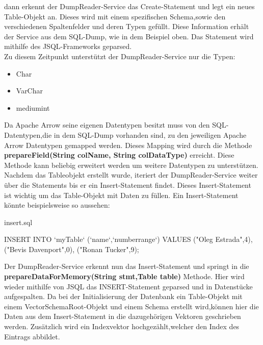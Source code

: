 dann erkennt der DumpReader-Service das Create-Statement und legt ein neues Table-Objekt an. Dieses wird mit einem spezifischen Schema,sowie den verschiedenen Spaltenfelder und deren Typen gefüllt.
Diese Information erhält der Service aus dem SQL-Dump, wie in dem Beispiel oben.
Das Statement wird mithilfe des JSQL-Frameworks geparsed. \\

Zu diesem Zeitpunkt unterstützt der DumpReader-Service nur die Typen:

\begin{itemize}
 \item Char
 \item VarChar
 \item mediumint
\end{itemize}

Da Apache Arrow seine eigenen Datentypen besitzt muss von den SQL-Datentypen,die in dem SQL-Dump vorhanden sind, zu den jeweiligen Apache Arrow Datentypen gemapped werden. 
Dieses Mapping wird durch die Methode \textbf{prepareField(String colName, String colDataType)} erreicht.
Diese Methode kann beliebig erweitert werden um weitere Datentypen zu unterstützen.\\
Nachdem das Tableobjekt erstellt wurde, iteriert der DumpReader-Service weiter über die Statements bis er ein Insert-Statement findet. Dieses Insert-Statement ist wichtig um das Table-Objekt mit Daten zu füllen.
Ein Insert-Statement könnte beispielsweise so aussehen:\\

\begin{terminalblock}{insert.sql}
  \begin{textcode}
INSERT INTO `myTable` (`name`,`numberrange`)
VALUES
  ("Oleg Estrada",4),
  ("Bevis Davenport",0),
  ("Ronan Tucker",9);
  \end{textcode}
\end{terminalblock}

Der DumpReader-Service erkennt nun das Insert-Statement und springt in die \textbf{prepareDataForMemory(String stmt,Table table)} Methode. Hier wird wieder mithilfe von JSQL das INSERT-Statement geparsed und in Datenstücke aufgespalten.
Da bei der Initialisierung der Datenbank ein Table-Objekt mit einem VectorSchemaRoot-Objekt und einem Schema erstellt wird,können hier die Daten aus dem Insert-Statement in die dazugehörigen Vektoren geschrieben werden.
Zusätzlich wird ein Indexvektor hochgezählt,welcher den Index des Eintrags abbildet.\\\\

